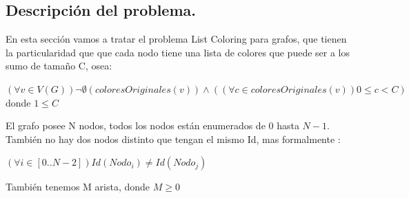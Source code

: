 \subsection{Descripción del problema.}
En esta sección vamos a tratar el problema List Coloring para grafos, que tienen la particularidad que que cada nodo tiene una lista de colores que puede ser a los sumo de tamaño C, osea:
\begin{center}
$(\forall v \in V(G)) \neg \emptyset(coloresOriginales(v)) \land ((\forall c \in coloresOriginales(v) ) 0\leq c <C)$ donde $1\leq C$
\end{center}
El grafo posee N nodos, todos los nodos están enumerados de $0$ hasta $N-1$. También no hay dos nodos distinto que tengan el mismo Id, mas formalmente : \newline
\begin{center}
	$(\forall i \in [0..N-2])Id(Nodo_i) \neq Id(Nodo_j)$
\end{center}
También tenemos M arista,  donde $M\geq 0$ \newline 


